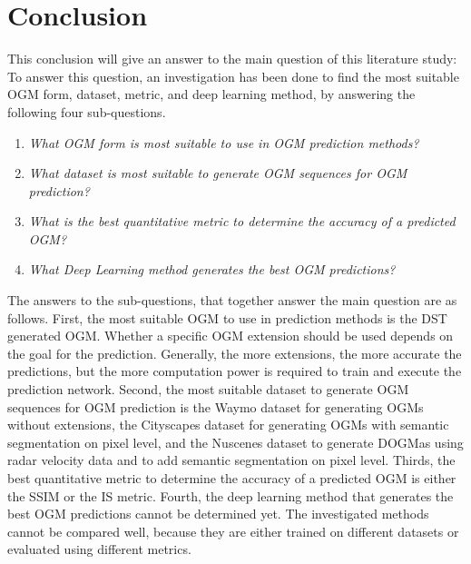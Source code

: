 \section{Conclusion} \label{sec:conclusion}
This conclusion will give an answer to the main question of this literature study:  
To answer this question, an investigation has been done to find the most suitable \gls{OGM} form, dataset, metric, and deep learning method, by answering the following four sub-questions. 

\begin{enumerate}
	\item \textit{What \gls{OGM} form is most suitable to use in \gls{OGM} prediction methods?}
	\item \textit{What dataset is most suitable to generate \gls{OGM} sequences for \gls{OGM} prediction?}
	\item \textit{What is the best quantitative metric to determine the accuracy of a predicted \gls{OGM}?}
	\item \textit{What Deep Learning method generates the best \gls{OGM} predictions?}	
\end{enumerate}

The answers to the sub-questions, that together answer the main question are as follows. First, the most suitable \gls{OGM} to use in prediction methods is the \gls{DST} generated \gls{OGM}. Whether a specific \gls{OGM} extension should be used depends on the goal for the prediction. Generally, the more extensions, the more accurate the predictions, but the more computation power is required to train and execute the prediction network. Second, the most suitable dataset to generate \gls{OGM} sequences for \gls{OGM} prediction is the Waymo \cite{sun2020scalability} dataset for generating \glspl{OGM} without extensions, the Cityscapes \cite{cordts2016cityscapes} dataset for generating \glspl{OGM} with semantic segmentation on pixel level, and the Nuscenes \cite{caesar2020nuscenes} dataset to generate \glspl{DOGMa} using radar velocity data and to add semantic segmentation on pixel level. Thirds, the best quantitative metric to determine the accuracy of a predicted \gls{OGM} is either the \gls{SSIM} or the \gls{IS} metric. Fourth, the deep learning method that generates the best \gls{OGM} predictions cannot be determined yet. The investigated methods cannot be compared well, because they are either trained on different datasets or evaluated using different metrics. 


